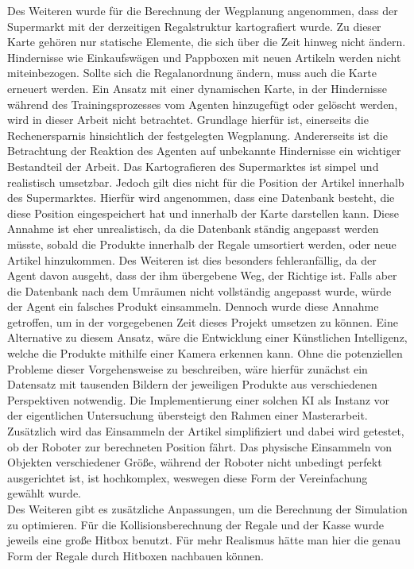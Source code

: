 Des Weiteren wurde für die Berechnung der Wegplanung angenommen, dass der Supermarkt mit der derzeitigen Regalstruktur kartografiert wurde. Zu dieser Karte gehören nur statische Elemente, die sich über die Zeit hinweg nicht ändern. Hindernisse wie Einkaufswägen und Pappboxen mit neuen Artikeln werden nicht miteinbezogen. Sollte sich die Regalanordnung ändern, muss auch die Karte erneuert werden. Ein Ansatz mit einer dynamischen Karte, in der Hindernisse während des Trainingsprozesses vom Agenten hinzugefügt oder gelöscht werden, wird in dieser Arbeit nicht betrachtet. Grundlage hierfür ist, einerseits die Rechenersparnis hinsichtlich der festgelegten Wegplanung. Andererseits ist die Betrachtung der Reaktion des Agenten auf unbekannte Hindernisse ein wichtiger Bestandteil der Arbeit. Das Kartografieren des Supermarktes ist simpel und realistisch umsetzbar. Jedoch gilt dies nicht für die Position der Artikel innerhalb des Supermarktes. Hierfür wird angenommen, dass eine Datenbank besteht, die diese Position eingespeichert hat und innerhalb der Karte darstellen kann. Diese Annahme ist eher unrealistisch, da die Datenbank ständig angepasst werden müsste, sobald die Produkte innerhalb der Regale umsortiert werden, oder neue Artikel hinzukommen. Des Weiteren ist dies besonders fehleranfällig, da der Agent davon ausgeht, dass der ihm übergebene Weg, der Richtige ist. Falls aber die Datenbank nach dem Umräumen nicht vollständig angepasst wurde, würde der Agent ein falsches Produkt einsammeln. Dennoch wurde diese Annahme getroffen, um in der vorgegebenen Zeit dieses Projekt umsetzen zu können. Eine Alternative zu diesem Ansatz, wäre die Entwicklung einer Künstlichen Intelligenz, welche die Produkte mithilfe einer Kamera erkennen kann. Ohne die potenziellen Probleme dieser Vorgehensweise zu beschreiben, wäre hierfür zunächst ein Datensatz mit tausenden Bildern der jeweiligen Produkte aus verschiedenen Perspektiven notwendig. Die Implementierung einer solchen KI als Instanz vor der eigentlichen Untersuchung übersteigt den Rahmen einer Masterarbeit. 
\\
Zusätzlich wird das Einsammeln der Artikel simplifiziert und dabei wird getestet, ob der Roboter zur berechneten Position fährt. Das physische Einsammeln von Objekten verschiedener Größe, während der Roboter nicht unbedingt perfekt ausgerichtet ist, ist hochkomplex, weswegen diese Form der Vereinfachung gewählt wurde.
\\
Des Weiteren gibt es zusätzliche Anpassungen, um die Berechnung der Simulation zu optimieren. Für die Kollisionsberechnung der Regale und der Kasse wurde jeweils eine große Hitbox benutzt. Für mehr Realismus hätte man hier die genau Form der Regale durch Hitboxen nachbauen können. 
